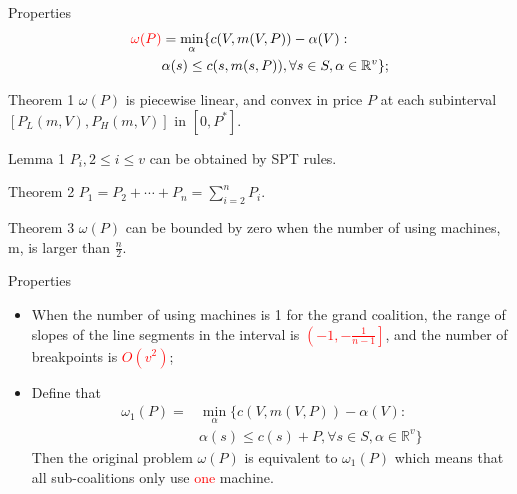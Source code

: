 \documentclass[14pt]{beamer}
\begin{document}
\begin{frame}{Properties}
	\vspace{-12mm}
	\small
		\begin{eqnarray*}
		\textcolor{red}{\omega(P)} & =\mathop{\min}_{\alpha}\{c(V,m(V,P))-\alpha(V): \\
		 &\alpha(s)\leq c(s,m(s,P)),\forall s \in S, \alpha\in\mathbb{R}^{v}\};
		\end{eqnarray*}
		\vspace{-10mm}
		\footnotesize
		\begin{block}{Theorem 1}
		${\omega(P)}$ is piecewise linear, and convex in price $P$ at each subinterval $[P_L(m,V),P_H(m,V)]$ in $[0,P^*]$.
		\end{block}

		\begin{block}{Lemma 1}
		$P_i, 2 \leq i \leq v$ can be obtained by SPT rules.
		\end{block}

		\begin{block}{Theorem 2}
		$P_{1}=P_{2}+\cdots+P_{n}=\sum_{i=2}^n P_i$.
		\end{block}

		\begin{block}{Theorem 3}
		$\omega(P)$ can be bounded by zero when the number of using machines, m, is larger than $\frac{n}{2}$.
		\end{block}

\end{frame}




\begin{frame}{Properties}
	\vspace{-1mm}
		\begin{itemize}
		\justifying
			\item When the number of using machines is 1 for the grand coalition, the range of slopes of the line segments in the interval is \textcolor{red}{$\left( -1 , -\frac{1}{n-1} \right]$}, and the number of breakpoints is \textcolor{red}{$ O(v^2)$};
			\pause
			\item Define that
			\begin{eqnarray*}
			{\omega_1(P)}=&\mathop{\min}_{\alpha}\{c(V,m(V,P))-\alpha(V): \\
			&\alpha(s)\leq c(s)+P,\forall s \in S, \alpha\in\mathbb{R}^{v}\}
			\end{eqnarray*}
			Then the original problem $\omega(P)$ is equivalent to $\omega_1(P)$ which means that all sub-coalitions only use \textcolor{red}{one} machine.

	\end{itemize}
\end{frame}
\end{document}
